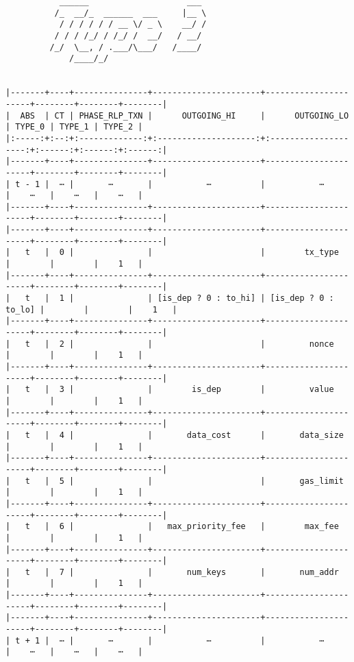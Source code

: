 \documentclass[varwidth=\maxdimen,margin=0.5cm,multi={verbatim}]{standalone}
\begin{document}
\begin{verbatim}
           ______                    ___ 
          /_  __/_  ______  ___     |__ \
           / / / / / / __ \/ _ \    __/ /
          / / / /_/ / /_/ /  __/   / __/ 
         /_/  \__, / .___/\___/   /____/ 
             /____/_/


|-------+----+---------------+----------------------+----------------------+--------+--------+--------|
|  ABS  | CT | PHASE_RLP_TXN |      OUTGOING_HI     |      OUTGOING_LO     | TYPE_0 | TYPE_1 | TYPE_2 |
|:-----:+:--:+:-------------:+:--------------------:+:--------------------:+:------:+:------:+:------:|
|-------+----+---------------+----------------------+----------------------+--------+--------+--------|
| t - 1 |  ⋯ |       ⋯       |           ⋯          |           ⋯          |    ⋯   |    ⋯   |    ⋯   |
|-------+----+---------------+----------------------+----------------------+--------+--------+--------|
|-------+----+---------------+----------------------+----------------------+--------+--------+--------|
|   t   |  0 |               |                      |        tx_type       |        |        |    1   |
|-------+----+---------------+----------------------+----------------------+--------+--------+--------|
|   t   |  1 |               | [is_dep ? 0 : to_hi] | [is_dep ? 0 : to_lo] |        |        |    1   |
|-------+----+---------------+----------------------+----------------------+--------+--------+--------|
|   t   |  2 |               |                      |         nonce        |        |        |    1   |
|-------+----+---------------+----------------------+----------------------+--------+--------+--------|
|   t   |  3 |               |        is_dep        |         value        |        |        |    1   |
|-------+----+---------------+----------------------+----------------------+--------+--------+--------|
|   t   |  4 |               |       data_cost      |       data_size      |        |        |    1   |
|-------+----+---------------+----------------------+----------------------+--------+--------+--------|
|   t   |  5 |               |                      |       gas_limit      |        |        |    1   |
|-------+----+---------------+----------------------+----------------------+--------+--------+--------|
|   t   |  6 |               |   max_priority_fee   |        max_fee       |        |        |    1   |
|-------+----+---------------+----------------------+----------------------+--------+--------+--------|
|   t   |  7 |               |       num_keys       |       num_addr       |        |        |    1   |
|-------+----+---------------+----------------------+----------------------+--------+--------+--------|
|-------+----+---------------+----------------------+----------------------+--------+--------+--------|
| t + 1 |  ⋯ |       ⋯       |           ⋯          |           ⋯          |    ⋯   |    ⋯   |    ⋯   |

\end{verbatim}
\end{document}
